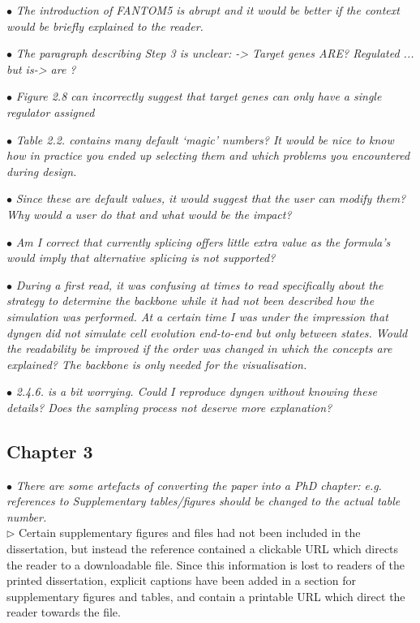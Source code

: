\documentclass[10pt]{article}
\newcommand{\exam}[2][\  ]{\hspace{0pt}\marginpar{\color{red}#1}$\bullet$ \textit{#2}}
\newcommand{\imp}[1]{{\color{red} #1}}
\newcommand{\answ}[1]{{\color{blue} $\triangleright$ #1}}
\newcommand{\bigexclaim}{\raisebox{-0.1em}{\BigTriangleUp}\hspace{-0.32em}\llap{\small\textbf{!}}\hspace{0.32em}}
\newcommand{\tagimp}{\bigexclaim}
\newcommand{\tagtime}{{\Large $\hourglass$}}
\begin{document}
{\exam{The introduction of FANTOM5 is abrupt and it would be better if the context
		would be briefly explained to the reader.}
	
\exam{The paragraph describing Step 3 is unclear: -> Target genes ARE? Regulated
		... but is-> are ?}

\exam{Figure 2.8 can incorrectly suggest that target genes can only have a single
		regulator assigned}


\exam[\tagimp \tagtime]{\imp{Table 2.2. contains many default ‘magic’ numbers?} It would be nice to know
		how in practice you ended up selecting them and which problems you
		encountered during design.}


\exam{Since these are default values, it would suggest
		that the user can modify them? Why would a user do that and what would be
		the impact?}
	
\exam{Am I correct that currently splicing offers little extra value as the formula’s
		would imply that alternative splicing is not supported?}


\exam[\tagimp \tagtime]{\imp{During a first read, it was confusing at times to read specifically about the
	strategy to determine the backbone while it had not been described how the
	simulation was performed.} At a certain time I was under the impression that
	dyngen did not simulate cell evolution end-to-end but only between states.
	Would the readability be improved if the order was changed in which the
	concepts are explained? The backbone is only needed for the visualisation.}


\exam{2.4.6. is a bit worrying. Could I reproduce dyngen without knowing these
		details? Does the sampling process not deserve more explanation?}
	



\subsection{Chapter 3}

\exam{There are some artefacts of converting the paper into a PhD chapter: e.g.
	references to Supplementary tables/figures should be changed to the actual
	table number.} \\
\answ{Certain supplementary figures and files had not been included in the dissertation, but instead the reference contained a clickable URL which directs the reader to a downloadable file. Since this information is lost to readers of the printed dissertation, explicit captions have been added in a section for supplementary figures and tables, and contain a printable URL which direct the reader towards the file.}

}
\end{document}
